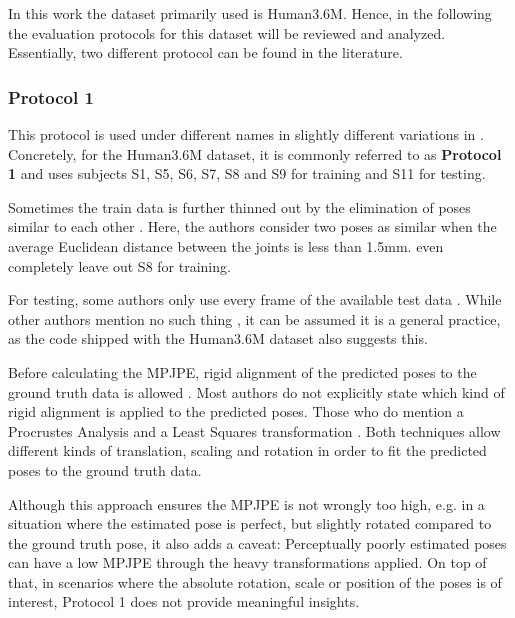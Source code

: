 In this work the dataset primarily used is Human3.6M.
Hence, in the following the evaluation protocols for this dataset will be reviewed and analyzed.
Essentially, two different protocol can be found in the literature.

\subsubsection{Protocol 1}

This protocol is used under different names in slightly different variations in \cite{sun17, drover18, moreno-noguer16, yasin16, kostrikov14, tome17}.
Concretely, for the Human3.6M dataset, it is commonly referred to as \textbf{Protocol 1} and uses subjects S1, S5, S6, S7, S8 and S9 for training and S11 for testing.

Sometimes the train data is further thinned out by the elimination of poses similar to each other \cite{yasin16}.
Here, the authors consider two poses as similar when the average Euclidean distance between the joints is less than 1.5mm.
\citet{drover18} even completely leave out S8 for training.

For testing, some authors only use every  frame of the available test data \cite{sun17, chen17, yasin16, moreno-noguer16, tome17}.
While other authors mention no such thing \cite{drover18, kostrikov14}, it can be assumed it is a general practice, as the code shipped with the Human3.6M dataset also suggests this.

Before calculating the MPJPE, rigid alignment of the predicted poses to the ground truth data is allowed  \cite{drover18, yasin16, kostrikov14, sun17, tome17, chen17}.
Most authors do not explicitly state which kind of rigid alignment is applied to the predicted poses.
Those who do mention a Procrustes Analysis \cite{sun17, tome17} and a Least Squares transformation \cite{kostrikov14}.
Both techniques allow different kinds of translation, scaling and rotation in order to fit the predicted poses to the ground truth data.

Although this approach ensures the MPJPE is not wrongly too high, e.g. in a situation where the estimated pose is perfect, but slightly rotated compared to the ground truth pose, it also adds a caveat:
Perceptually poorly estimated poses can have a low MPJPE through the heavy transformations applied.
On top of that, in scenarios where the absolute rotation, scale or position of the poses is of interest, Protocol 1 does not provide meaningful insights.

